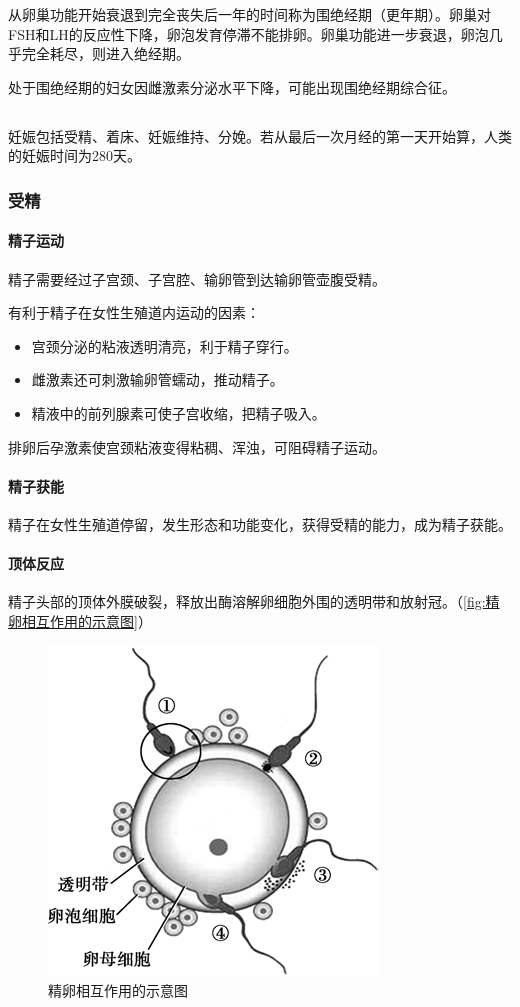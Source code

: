 从卵巢功能开始衰退到完全丧失后一年的时间称为围绝经期（更年期）。卵巢对FSH和LH的反应性下降，卵泡发育停滞不能排卵。卵巢功能进一步衰退，卵泡几乎完全耗尽，则进入绝经期。

处于围绝经期的妇女因雌激素分泌水平下降，可能出现围绝经期综合征。

\subsection{}

妊娠包括受精、着床、妊娠维持、分娩。若从最后一次月经的第一天开始算，人类的妊娠时间为280天。

\subsubsection{受精}

\paragraph{精子运动}

精子需要经过子宫颈、子宫腔、输卵管到达输卵管壶腹受精。

有利于精子在女性生殖道内运动的因素：
\begin{itemize}
	\item 宫颈分泌的粘液透明清亮，利于精子穿行。
	\item 雌激素还可刺激输卵管蠕动，推动精子。
	\item 精液中的前列腺素可使子宫收缩，把精子吸入。
\end{itemize}

排卵后孕激素使宫颈粘液变得粘稠、浑浊，可阻碍精子运动。

\paragraph{精子获能}

精子在女性生殖道停留，发生形态和功能变化，获得受精的能力，成为精子获能。

\paragraph{顶体反应}

精子头部的顶体外膜破裂，释放出酶溶解卵细胞外围的透明带和放射冠。（\autoref{fig:精卵相互作用的示意图}）

\begin{figure}[htbp]
	\centering
	\includegraphics[width=0.3\linewidth]{Pics/精卵相互作用的示意图}
	\caption{精卵相互作用的示意图}
	\label{fig:精卵相互作用的示意图}
\end{figure}



